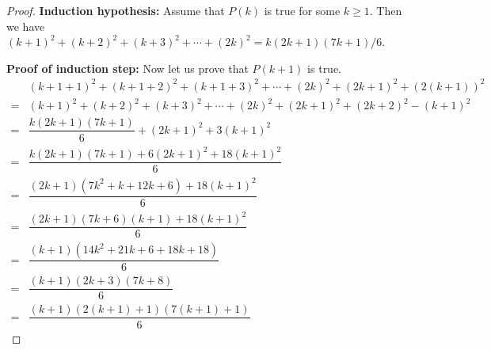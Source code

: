 \documentclass[12pt,a4paper,UTF8]{article}
\theoremstyle{definition}
\begin{document}
\begin{enumerate}
\begin{proof}
        \textbf{Induction hypothesis:} Assume that $P(k)$ is true for some $k\geq1$. Then we have $(k+1)^2+(k+2)^2+(k+3)^2+\cdots+(2k)^2=k(2k+1)(7k+1)/6$.
        
        \textbf{Proof of induction step:} Now let us prove that $P(k + 1)$ is true.
        \begin{align*}
        &(k+1+1)^2+(k+1+2)^2+(k+1+3)^2+\cdots+(2k)^2+(2k+1)^2+\left(2(k+1)\right)^2\\
        =&(k+1)^2+(k+2)^2+(k+3)^2+\cdots+(2k)^2+(2k+1)^2+(2k+2)^2-(k+1)^2\\
        =&\dfrac{k(2k+1)(7k+1)}{6}+(2k+1)^2+3(k+1)^2\\
        =&\dfrac{k(2k+1)(7k+1)+6(2k+1)^2+18(k+1)^2}{6}\\
        =&\dfrac{(2k+1)(7k^2+k+12k+6)+18(k+1)^2}{6}\\
        =&\dfrac{(2k+1)(7k+6)(k+1)+18(k+1)^2}{6}\\
        =&\dfrac{(k+1)(14k^2+21k+6+18k+18)}{6}\\
        =&\dfrac{(k+1)(2k+3)(7k+8)}{6}\\
        =&\dfrac{(k+1)(2(k+1)+1)(7(k+1)+1)}{6}
        \end{align*}
    \end{proof}

\end{enumerate}

\vspace{20pt}



\end{document}
